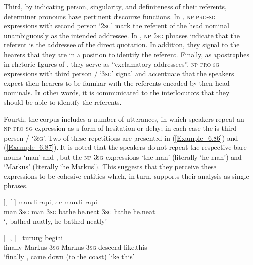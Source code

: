 Third, by indicating person, singularity, and definiteness of their referents, determiner pronouns have pertinent discourse functions. In , \textsc{np} \textsc{pro-sg} expressions with second person  ‘2\textsc{sg}’ mark the referent of the head nominal unambiguously as the intended addressee. In , \textsc{np} \textsc{2sg}  phrases indicate that the referent is the addressee of the direct quotation. In addition, they signal to the hearers that they are in a position to identify the referent. Finally, as apostrophes in rhetoric figures of , they serve as “exclamatory addressees”. \textsc{np} \textsc{pro-sg} expressions with third person / ‘3\textsc{sg}’ signal and accentuate that the speakers expect their hearers to be familiar with the referents encoded by their head nominals. In other words, it is communicated to the interlocutors that they should be able to identify the referents.



Fourth, the corpus includes a number of utterances, in which speakers repeat an \textsc{np} \textsc{pro-sg} expression as a form of hesitation or delay; in each case the  is third person / ‘3\textsc{sg}’. Two of these repetitions are presented in (\ref{Example_6.86}) and (\ref{Example_6.87}). It is noted that the speakers do not repeat the respective bare nouns  ‘man’ and , but the \textsc{np} \textsc{3sg} expressions  ‘the man’ (literally ‘he man’) and  ‘Markus’ (literally ‘he Markus’). This suggests that they perceive these expressions to be cohesive entities which, in turn, supports their analysis as single  phrases.


\ea
\label{Example_6.86}
\gll {[\bluebold{pace}} {],} {[} {]} {mandi} {rapi,} {de} {mandi} {rapi}\\ %
 man  \textsc{3sg}  man  \textsc{3sg}  bathe  be.neat  \textsc{3sg}  bathe  be.neat\\

\glt
‘,  bathed neatly, he bathed neatly’ \textstyleExampleSource{[081109-007-JR.0002]}
\z

\ea
\label{Example_6.87}
 {[} {],} {[} {]} {turung} {begini}\\ %
 finally  Markus  \textsc{3sg}  Markus  \textsc{3sg}  descend  like.this\\
\glt
‘finally ,  came down (to the coast) like this’ \textstyleExampleSource{[080922-010a-CvNF.0204]}
\z


